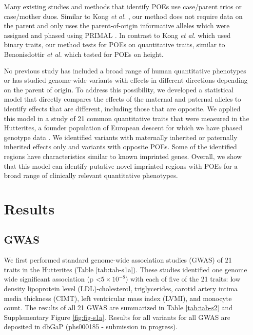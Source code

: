 Many existing studies and methods that identify POEs use case/parent trios or case/mother duos\citep{Chuang:2017kp,Howey:2012hj,Ainsworth:2010bp,Weinberg:1999km,Weinberg:1998cf}. Similar to Kong \emph{et al.} \citep{Kong:2009kk}, our method does not require data on the parent and only uses the parent-of-origin informative alleles which were assigned and phased using PRIMAL \citep{Livne2015}.  In contrast to Kong \emph{et al.} \citep{Kong:2009kk} which used binary traits, our method tests for POEs on quantitative traits, similar to Benonisdottir \emph{et al.} \citep{Benonisdottir:2016dz} which tested for POEs on height.

No previous study has included a broad range of human quantitative phenotypes or has studied genome-wide variants with effects in different directions depending on the parent of origin. To address this possibility, we developed a statistical model that directly compares the effects of the maternal and paternal alleles to identify effects that are different, including those that are opposite. We applied this model in a study of 21 common quantitative traits that were measured in the Hutterites, a founder population of European descent for which we have phased genotype data \citep{Livne2015}. We identified variants with maternally inherited or paternally inherited effects only and variants with opposite POEs. Some of the identified regions have characteristics similar to known imprinted genes. Overall, we show that this model can identify putative novel imprinted regions with POEs for a broad range of clinically relevant quantitative phenotypes.

\section{Results}\label{ch02-results}

\subsection{GWAS}\label{GWAS Results}
We first performed standard genome-wide association studies (GWAS) of 21 traits in the Hutterites (Table \ref{tab:tab-s1a}). These studies identified one genome wide significant association (p \textless $5 \times10^{-8} $) with each of five of the 21 traits: low density lipoprotein level (LDL)-cholesterol, triglycerides, carotid artery intima media thickness (CIMT), left ventricular mass index (LVMI), and monocyte count. The results of all 21 GWAS are summarized in Table \ref{tab:tab-s2} and Supplementary Figure \ref{fig:fig-s1a}. Results for all variants for all GWAS are deposited in dbGaP (phs000185 - submission in progress).

